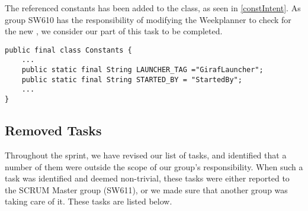 The referenced constants has been added to the  class, as seen
in \autoref{constIntent}. As group SW610 has the responsibility of
modifying the Weekplanner to check for the new , we consider our
part of this task to be completed.\nl

\begin{minipage}[H]{\linewidth}
\begin{lstlisting}[caption = Constants containing the strings for the Launchers's \textc{Intent}., label = constIntent] 
public final class Constants {
	...
	public static final String LAUNCHER_TAG ="GirafLauncher";
	public static final String STARTED_BY = "StartedBy";
	...
}
\end{lstlisting}
\end{minipage}

\subsection{Removed Tasks}
Throughout the sprint, we have revised our list of tasks, and identified
that a number of them were outside the scope of our group's responsibility.
When such a task was identified and deemed non-trivial, these tasks were either
reported to the SCRUM Master group (SW611), or we made sure that another group
was taking care of it. These tasks are listed below.

